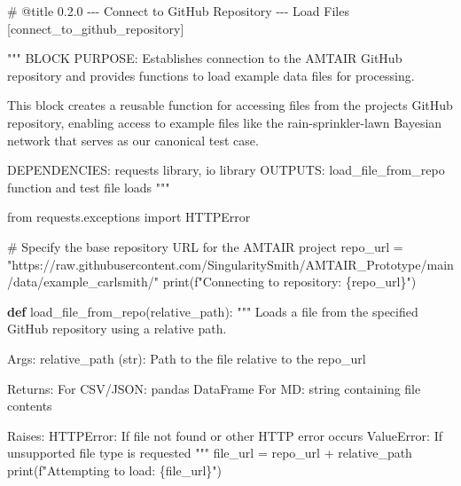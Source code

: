 \documentclass[
  11pt,
  letterpaper,
]{book}
\newenvironment{Shaded}{\begin{snugshade}}{\end{snugshade}}
\newcommand{\BuiltInTok}[1]{\textcolor[rgb]{0.00,0.23,0.31}{#1}}
\newcommand{\CommentTok}[1]{\textcolor[rgb]{0.37,0.37,0.37}{#1}}
\newcommand{\ImportTok}[1]{\textcolor[rgb]{0.00,0.46,0.62}{#1}}
\newcommand{\KeywordTok}[1]{\textcolor[rgb]{0.00,0.23,0.31}{\textbf{#1}}}
\newcommand{\NormalTok}[1]{\textcolor[rgb]{0.00,0.23,0.31}{#1}}
\newcommand{\OperatorTok}[1]{\textcolor[rgb]{0.37,0.37,0.37}{#1}}
\newcommand{\SpecialCharTok}[1]{\textcolor[rgb]{0.37,0.37,0.37}{#1}}
\newcommand{\SpecialStringTok}[1]{\textcolor[rgb]{0.13,0.47,0.30}{#1}}
\newcommand{\StringTok}[1]{\textcolor[rgb]{0.13,0.47,0.30}{#1}}
\begin{document}
\label{connect_to_github_repository}
\begin{Shaded}
\begin{Highlighting}[]
\CommentTok{\# @title 0.2.0 {-}{-}{-} Connect to GitHub Repository {-}{-}{-} Load Files [connect\_to\_github\_repository]}

\CommentTok{"""}
\CommentTok{BLOCK PURPOSE: Establishes connection to the AMTAIR GitHub repository and provides}
\CommentTok{functions to load example data files for processing.}

\CommentTok{This block creates a reusable function for accessing files from the project\textquotesingle{}s}
\CommentTok{GitHub repository, enabling access to example files like the rain{-}sprinkler{-}lawn}
\CommentTok{Bayesian network that serves as our canonical test case.}

\CommentTok{DEPENDENCIES: requests library, io library}
\CommentTok{OUTPUTS: load\_file\_from\_repo function and test file loads}
\CommentTok{"""}

\ImportTok{from}\NormalTok{ requests.exceptions }\ImportTok{import}\NormalTok{ HTTPError}

\CommentTok{\# Specify the base repository URL for the AMTAIR project}
\NormalTok{repo\_url }\OperatorTok{=} \StringTok{"https://raw.githubusercontent.com/SingularitySmith/AMTAIR\_Prototype/main/data/example\_carlsmith/"}
\BuiltInTok{print}\NormalTok{(}\SpecialStringTok{f"Connecting to repository: }\SpecialCharTok{\{}\NormalTok{repo\_url}\SpecialCharTok{\}}\SpecialStringTok{"}\NormalTok{)}

\KeywordTok{def}\NormalTok{ load\_file\_from\_repo(relative\_path):}
    \CommentTok{"""}
\CommentTok{    Loads a file from the specified GitHub repository using a relative path.}

\CommentTok{    Args:}
\CommentTok{        relative\_path (str): Path to the file relative to the repo\_url}

\CommentTok{    Returns:}
\CommentTok{        For CSV/JSON: pandas DataFrame}
\CommentTok{        For MD: string containing file contents}

\CommentTok{    Raises:}
\CommentTok{        HTTPError: If file not found or other HTTP error occurs}
\CommentTok{        ValueError: If unsupported file type is requested}
\CommentTok{    """}
\NormalTok{    file\_url }\OperatorTok{=}\NormalTok{ repo\_url }\OperatorTok{+}\NormalTok{ relative\_path}
    \BuiltInTok{print}\NormalTok{(}\SpecialStringTok{f"Attempting to load: }\SpecialCharTok{\{}\NormalTok{file\_url}\SpecialCharTok{\}}\SpecialStringTok{"}\NormalTok{)}


\end{Highlighting}
\end{Shaded}
\end{document}
